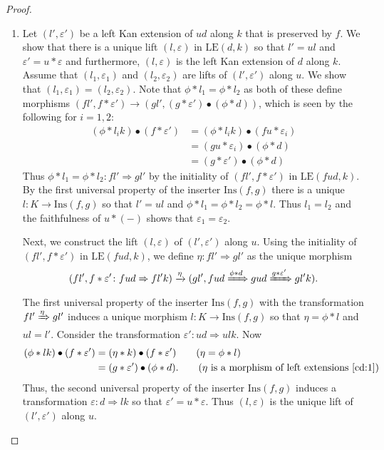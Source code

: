 \documentclass[11pt]{article}
\theoremstyle{plain}
\theoremstyle{definition}
\numberwithin{equation}{section}
\newcommand{\Ins}{\mathrm{Ins}}
\newcommand{\LE}{\mathrm{LE}}
\begin{document}
\begin{proof}
\begin{enumerate}
       \item Let $(l',\varepsilon')$ be a left Kan extension of $ud$ along $k$ that is preserved by $f$. We show that there is a unique lift $(l,\varepsilon)$ in $\LE(d,k)$ so that $l' = ul$ and $\varepsilon' = u*\varepsilon$ and furthermore, $(l,\varepsilon)$ is the left Kan extension of $d$ along $k$. Assume that $(l_1,\varepsilon_1)$ and $(l_2,\varepsilon_2)$ are lifts of $(l',\varepsilon')$ along $u$. We show that $(l_1,\varepsilon_1) = (l_2,\varepsilon_2)$. Note that $\phi*l_1 = \phi*l_2$ as both of these define morphisms $(fl',f*\varepsilon')\to (gl',(g*\varepsilon')\bullet(\phi*d))$, which is seen by the following for $i = 1,2$:
       \begin{align*}
           (\phi*l_ik)\bullet (f*\varepsilon')
           &= (\phi*l_ik)\bullet (fu*\varepsilon_i)\tag{$\varepsilon' = u*\varepsilon_i$}\\
           &= (gu*\varepsilon_i)\bullet (\phi*d)\tag{Bifunctoriality of $*$}\\
           &= (g*\varepsilon')\bullet(\phi*d)\tag{$\varepsilon' = u*\varepsilon_i$}
       \end{align*}
       Thus  $\phi*l_1 = \phi*l_2\colon fl'\Rightarrow gl'$ by the initiality of $(fl',f*\varepsilon')$ in $\LE(fud,k)$. By the first universal property of the inserter $\Ins(f,g)$ there is a unique $l\colon K\to \Ins(f,g)$ so that $l' = ul$ and $\phi*l_1 = \phi*l_2 = \phi*l$. Thus $l_1 = l_2$ and the faithfulness of $u*(-)$ shows that $\varepsilon_1 = \varepsilon_2$. 
       
       
       Next, we construct the lift $(l,\varepsilon)$ of $(l',\varepsilon')$ along $u$. Using the initiality of $(fl',f*\varepsilon')$ in $\LE(fud,k)$, we define $\eta\colon fl'\Rightarrow gl'$ as the unique morphism 
       \begin{equation}\label{cd:1}
           (fl',f*\varepsilon'\colon fud\Rightarrow fl'k)\xrightarrow{\eta} (gl',fud\xRightarrow{\phi*d}gud\xRightarrow{g*\varepsilon'}gl'k).
       \end{equation}
       The first universal property of the inserter $\Ins(f,g)$ with the transformation $fl'\xRightarrow{\eta} gl'$ induces a unique morphism $l\colon K\to \Ins(f,g)$ so that $\eta = \phi*l$ and $ul = l'$. Consider the transformation $\varepsilon'\colon ud\Rightarrow ulk$. Now
       \begin{align*}
           (\phi* lk)\bullet (f*\varepsilon')
           &= (\eta*k)\bullet(f*\varepsilon') \tag{$\eta = \phi*l$}\\
           &= (g*\varepsilon')\bullet (\phi*d). \tag{$\eta$ is a morphism of left extensions \ref{cd:1}}
       \end{align*}
       Thus, the second universal property of the inserter $\Ins(f,g)$ induces a transformation $\varepsilon\colon d\Rightarrow lk$ so that $\varepsilon' = u*\varepsilon$. Thus $(l,\varepsilon)$ is the unique lift of $(l',\varepsilon')$ along $u$.
       

\end{enumerate}
\end{proof}
\end{document}
